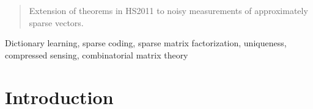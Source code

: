 \documentclass[journal,onecolumn]{IEEEtran}
\begin{document}







\maketitle


\begin{abstract}
Extension of theorems in HS2011 to noisy measurements of approximately sparse vectors.
\end{abstract}


\begin{IEEEkeywords}
Dictionary learning, sparse coding, sparse matrix factorization, uniqueness, compressed sensing, combinatorial matrix theory
\end{IEEEkeywords}

%

\section{Introduction}
% 
% 
% 
% 
\end{document}
